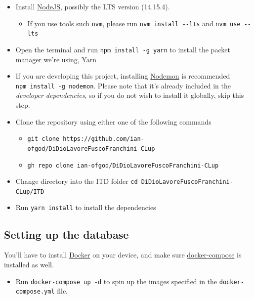 \documentclass[
]{article}
\providecommand{\tightlist}{%
  \setlength{\itemsep}{0pt}\setlength{\parskip}{0pt}}
\begin{document}
\begin{itemize}
\tightlist
\item
  Install \href{https://nodejs.org/}{NodeJS}, possibly the LTS version
  (14.15.4).

  \begin{itemize}
  \tightlist
  \item
    If you use tools such \texttt{nvm}, please run
    \texttt{nvm\ install\ -\/-lts} and \texttt{nvm\ use\ -\/-lts}
  \end{itemize}
\item
  Open the terminal and run \texttt{npm\ install\ -g\ yarn} to install
  the packet manager we're using, \href{https://yarnpkg.com}{Yarn}
\item
  If you are developing this project, installing
  \href{https://github.com/remy/nodemon}{Nodemon} is recommended
  \texttt{npm\ install\ -g\ nodemon}. Please note that it's already
  included in the \emph{developer dependencies}, so if you do not wish
  to install it globally, skip this step.
\item
  Clone the repository using either one of the following commands

  \begin{itemize}
  \tightlist
  \item
    \texttt{git\ clone\ https://github.com/ian-ofgod/DiDioLavoreFuscoFranchini-CLup}
  \item
    \texttt{gh\ repo\ clone\ ian-ofgod/DiDioLavoreFuscoFranchini-CLup}
  \end{itemize}
\item
  Change directory into the ITD folder
  \texttt{cd\ DiDioLavoreFuscoFranchini-CLup/ITD}
\item
  Run \texttt{yarn\ install} to install the dependencies
\end{itemize}

\hypertarget{setting-up-the-database}{%
\subsection{Setting up the database}\label{setting-up-the-database}}

You'll have to install \href{https://www.docker.com/}{Docker} on your
device, and make sure
\href{https://docs.docker.com/compose/install/}{docker-compose} is
installed as well.

\begin{itemize}
\tightlist
\item
  Run \texttt{docker-compose\ up\ -d} to spin up the images specified in
  the \texttt{docker-compose.yml} file.
\end{itemize}
\end{document}
